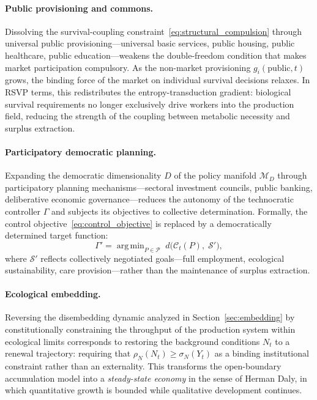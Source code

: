 \documentclass[12pt,a4paper]{article}
\theoremstyle{definition}
\theoremstyle{remark}
\DeclareMathOperator*{\argmin}{arg\,min}
\begin{document}
\paragraph{Public provisioning and commons.} Dissolving the survival-coupling constraint~\eqref{eq:structural_compulsion} through universal public provisioning---universal basic services, public housing, public healthcare, public education---weakens the double-freedom condition that makes market participation compulsory. As the non-market provisioning $g_i(\text{public}, t)$ grows, the binding force of the market on individual survival decisions relaxes. In RSVP terms, this redistributes the entropy-transduction gradient: biological survival requirements no longer exclusively drive workers into the production field, reducing the strength of the coupling between metabolic necessity and surplus extraction.

\paragraph{Participatory democratic planning.} Expanding the democratic dimensionality $D$ of the policy manifold $\mathcal{M}_D$ through participatory planning mechanisms---sectoral investment councils, public banking, deliberative economic governance---reduces the autonomy of the technocratic controller $\Gamma$ and subjects its objectives to collective determination. Formally, the control objective~\eqref{eq:control_objective} is replaced by a democratically determined target function:
\begin{equation}
  \Gamma' = \argmin_{P \in \mathcal{P}} \; d\!\bigl(\mathcal{C}_t(P),\; \mathcal{S}'\bigr),
\end{equation}
where $\mathcal{S}'$ reflects collectively negotiated goals---full employment, ecological sustainability, care provision---rather than the maintenance of surplus extraction.

\paragraph{Ecological embedding.} Reversing the disembedding dynamic analyzed in Section~\ref{sec:embedding} by constitutionally constraining the throughput of the production system within ecological limits corresponds to restoring the background conditions $N_t$ to a renewal trajectory: requiring that $\rho_N(N_t) \geq \sigma_N(Y_t)$ as a binding institutional constraint rather than an externality. This transforms the open-boundary accumulation model into a \emph{steady-state economy} in the sense of Herman Daly, in which quantitative growth is bounded while qualitative development continues.
\end{document}
